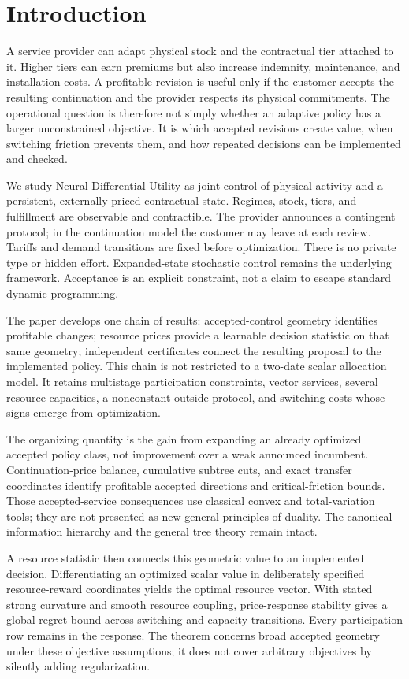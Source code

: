 \documentclass[11pt,letterpaper]{article}
\theoremstyle{definition}
\newcommand{\1}{\mathbf 1}
\begin{document}
\section{Introduction}
A service provider can adapt physical stock and the contractual tier attached to it. Higher tiers can earn premiums but also increase indemnity, maintenance, and installation costs. A profitable revision is useful only if the customer accepts the resulting continuation and the provider respects its physical commitments. The operational question is therefore not simply whether an adaptive policy has a larger unconstrained objective. It is which accepted revisions create value, when switching friction prevents them, and how repeated decisions can be implemented and checked.

We study Neural Differential Utility as joint control of physical activity and a persistent, externally priced contractual state. Regimes, stock, tiers, and fulfillment are observable and contractible. The provider announces a contingent protocol; in the continuation model the customer may leave at each review. Tariffs and demand transitions are fixed before optimization. There is no private type or hidden effort. Expanded-state stochastic control remains the underlying framework. Acceptance is an explicit constraint, not a claim to escape standard dynamic programming.

The paper develops one chain of results: accepted-control geometry identifies profitable changes; resource prices provide a learnable decision statistic on that same geometry; independent certificates connect the resulting proposal to the implemented policy. This chain is not restricted to a two-date scalar allocation model. It retains multistage participation constraints, vector services, several resource capacities, a nonconstant outside protocol, and switching costs whose signs emerge from optimization.

The organizing quantity is the gain from expanding an already optimized accepted policy class, not improvement over a weak announced incumbent. Continuation-price balance, cumulative subtree cuts, and exact transfer coordinates identify profitable accepted directions and critical-friction bounds. Those accepted-service consequences use classical convex and total-variation tools; they are not presented as new general principles of duality. The canonical information hierarchy and the general tree theory remain intact.

A resource statistic then connects this geometric value to an implemented decision. Differentiating an optimized scalar value in deliberately specified resource-reward coordinates yields the optimal resource vector. With stated strong curvature and smooth resource coupling, price-response stability gives a global regret bound across switching and capacity transitions. Every participation row remains in the response. The theorem concerns broad accepted geometry under these objective assumptions; it does not cover arbitrary objectives by silently adding regularization.
\end{document}
